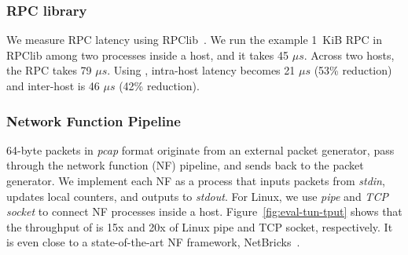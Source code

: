 




\subsubsection{RPC library}
\quad

We measure RPC latency using RPClib~\cite{rpclib}.
We run the example 1~KiB RPC in RPClib among two processes inside a host, and it takes 45 $\mu s$. Across two hosts, the RPC takes 79 $\mu s$.
Using \sys{}, intra-host latency becomes 21 $\mu s$ (53\% reduction) and inter-host is 46 $\mu s$ (42\% reduction).


\subsubsection{Network Function Pipeline}
\quad

64-byte packets in \emph{pcap} format originate from an external packet generator, pass through the network function (NF) pipeline, and sends back to the packet generator.
We implement each NF as a process that inputs packets from \emph{stdin}, updates local counters, and outputs to \emph{stdout}.
For Linux, we use \emph{pipe} and \emph{TCP socket} to connect NF processes inside a host.
Figure~\ref{fig:eval-tun-tput} shows that the throughput of \sys{} is 15x and 20x of Linux pipe and TCP socket, respectively.
It is even close to a state-of-the-art NF framework, NetBricks~\cite{panda2016netbricks}.


